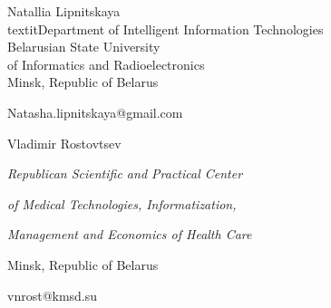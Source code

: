\documentclass[a4paper]{article}
\begin{document}
\begin{multicols}{2}
   \begin{center}
        Natallia Lipnitskaya
\\textit{Department of Intelligent Information Technologies
\\Belarusian State University
\\of Informatics and Radioelectronics}
\\ Minsk, Republic of Belarus
\par Natasha.lipnitskaya@gmail.com
 \end{center}
\begin{center}
  Vladimir Rostovtsev
\par \textit{Republican Scientific and Practical Center}
\par \textit{of Medical Technologies, Informatization,}
\par \textit{Management and Economics of Health Care}
\par Minsk, Republic of Belarus
\par vnrost@kmsd.su
\end{center}
\end{multicols}
\end{document}
